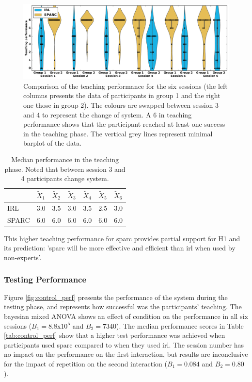 \begin{figure}[ht]
	\includegraphics[width=\textwidth]{teaching_performance.pdf}
	\centering
	\caption{Comparison of the teaching performance for the six sessions (the left columns presents the data of participants in group 1 and the right one those in group 2). The colours are swapped between session 3 and 4 to represent the change of system. A 6 in teaching performance shows that the participant reached at least one success in the teaching phase. The vertical grey lines represent minimal barplot of the data.
	}
	\label{fig:control_teaching_performance}
\end{figure}

\begin{table}[ht]
	\centering
	\caption{Median performance in the teaching phase. Noted that between session 3 and 4 participants change system.}
	\label{tab:control_teaching_perf}
	\begin{tabular}{@{}lllllll@{}}\toprule
		& $\widetilde{X}_{1}$ & $\widetilde{X}_{2}$ & $\widetilde{X}_{3}$ & $\widetilde{X}_{4}$ & $\widetilde{X}_{5}$ & $\widetilde{X}_{6}$\\ 
		\midrule
		IRL & 3.0 & 3.5 & 3.0 & 3.5 & 2.5 & 3.0\\
		SPARC & 6.0 & 6.0 & 6.0 & 6.0 & 6.0 & 6.0\\
		\bottomrule
	\end{tabular}
\end{table}

This higher teaching performance for \gls{sparc} provides partial support for H1 and its prediction: '\gls{sparc} will be more effective and efficient than \gls{irl} when used by non-experts'.

\subsubsection{Testing Performance}

Figure \ref{fig:control_perf} presents the performance of the system during the testing phase, and represents how successful was the participants' teaching. The bayesian mixed ANOVA shows an effect of condition on the performance in all six sessions ($B_1=8.8$x$10^5$ and $B_2 = 7340$). The median performance scores in Table \ref{tab:control_perf} show that a higher test performance was achieved when participants used \gls{sparc} compared to when they used \gls{irl}. The session number has no impact on the performance on the first interaction, but results are inconclusive for the impact of repetition on the second interaction ($B_1=0.084$ and $B_2=0.80$).

